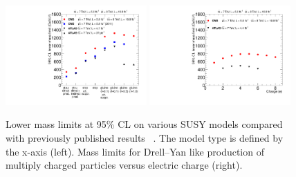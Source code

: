 \begin{figure}
 \begin{center}
  \includegraphics[clip=false, trim=0.0cm 0cm 0.0cm 0cm, width=0.48\textwidth]{figures/hscp_resultsNov2012}
  \includegraphics[clip=false, trim=0.0cm 0cm 0.0cm 0cm, width=0.48\textwidth]{figures/DYhscp_resultsNov2012}
 \end{center}
 \caption[Lower mass limits on HSCP produced in various models of new physics compared with previously published results]
{Lower mass limits at 95\% CL on various SUSY models compared with previously published results
~\cite{Aad:2011hz, Aad:2011yf, Aad:2011mb,Aad:2012vd, ATLASmCHAMPs, Khachatryan:2011ts, Chatrchyan:2012sp}. 
The model type is defined by the x-axis (left). 
Mass limits for Drell--Yan like production of multiply charged particles versus electric charge (right).}
   \label{fig:masslimits}
\end{figure}